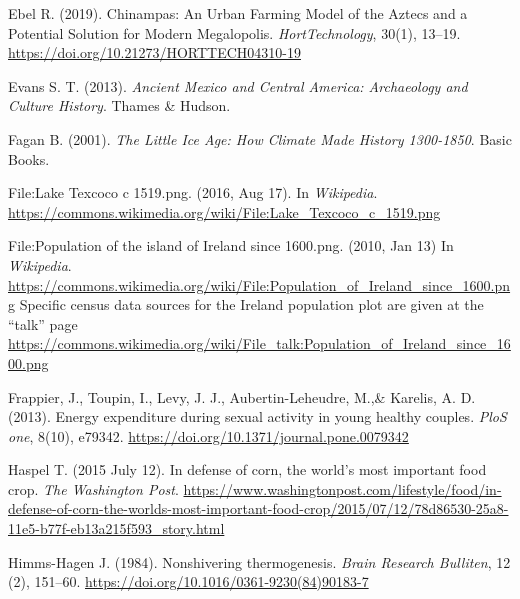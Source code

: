 \documentclass[11pt,letter]{article}
\begin{document}
\begin{thebibliography}{99}
Ebel R. 
(2019).
Chinampas: An Urban Farming Model of the Aztecs and a Potential Solution for Modern Megalopolis.
\textit{HortTechnology},
30(1), 13--19.
\url{https://doi.org/10.21273/HORTTECH04310-19}

Evans S. T.
(2013).
\textit{Ancient Mexico and Central America: Archaeology and Culture History}.
Thames \& Hudson.

Fagan B.
(2001).
\textit{The Little Ice Age: How Climate Made History 1300-1850}.
Basic Books.

File:Lake Texcoco c 1519.png.
(2016, Aug 17).
In \textit{Wikipedia}.
\url{https://commons.wikimedia.org/wiki/File:Lake\_Texcoco\_c\_1519.png}


File:Population of the island of Ireland since 1600.png.
(2010, Jan 13)
In \textit{Wikipedia}.
\url{https://commons.wikimedia.org/wiki/File:Population\_of\_Ireland\_since\_1600.png}
Specific census data sources for the Ireland population plot are given at the ``talk'' page 
\url{https://commons.wikimedia.org/wiki/File\_talk:Population\_of\_Ireland\_since\_1600.png}


Frappier, J., Toupin, I., Levy, J. J., Aubertin-Leheudre, M.,\& Karelis, A. D. 
(2013). 
Energy expenditure during sexual activity in young healthy couples. 
\textit{PloS one}, 8(10), e79342. 
\url{https://doi.org/10.1371/journal.pone.0079342}

Haspel T.
(2015 July 12). 
In defense of corn, the world’s most important food crop.
\textit{The Washington Post}.
\url{https://www.washingtonpost.com/lifestyle/food/in-defense-of-corn-the-worlds-most-important-food-crop/2015/07/12/78d86530-25a8-11e5-b77f-eb13a215f593_story.html}

Himms-Hagen J.
(1984).
Nonshivering thermogenesis. 
\textit{Brain Research Bulliten},
12 (2),
151--60.
\url{https://doi.org/10.1016/0361-9230(84)90183-7}


\end{thebibliography}
\end{document}

